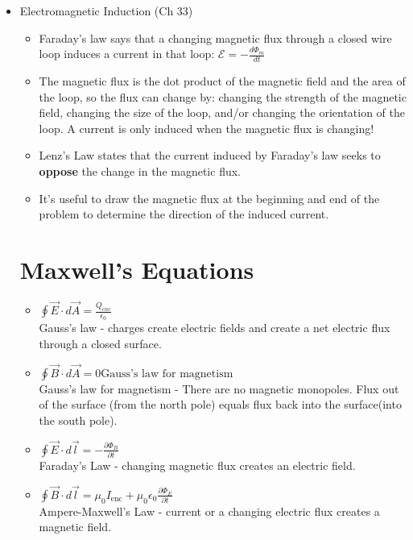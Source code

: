 \begin{itemize}
\item Electromagnetic Induction (Ch 33)
\begin{itemize}
\item Faraday's law says that a changing magnetic flux through a
  closed wire loop induces a current in that loop: $\displaystyle
  \mathcal{E} = - \frac{d \Phi_{m}}{dt}$
\item The magnetic flux is the dot product of the magnetic field and
  the area of the loop, so the flux can change by: changing the
  strength of the magnetic field, changing the size of the loop, and/or
  changing the orientation of the loop.  A current is only induced
  when the magnetic flux is changing! 
\item Lenz's Law states that the current induced by Faraday's law
  seeks to {\bf oppose} the change in the magnetic flux.   
\item It's useful to draw the magnetic flux at the beginning and end
  of the problem to determine the direction of the induced current.
\end{itemize}

\section{Maxwell's Equations }%
\begin{itemize}
\item $\oint \vec{E}\cdot d\vec{A} = \frac{Q_{enc}}{\epsilon_0} $\\
Gauss's law - charges create electric fields and create a net electric flux through a closed surface.
 \item $\oint \vec{B}\cdot d\vec{A} = 0 \text{Gauss's law for magnetism}$\\
 Gauss's law for magnetism - There are no magnetic monopoles.  Flux out of the surface (from the north pole) equals flux back into the surface(into the south pole).
\item $\displaystyle \oint \vec{E}\cdot d\vec{l} = -\frac{\partial \Phi_B}{\partial t}$\\
Faraday's Law - changing magnetic flux creates an electric field.

\item $\displaystyle \oint \vec{B}\cdot d\vec{l} = \mu_0 I_{\text{enc}} + \mu_0 \epsilon_0 \frac{\partial \Phi_E}{\partial t}$\\
Ampere-Maxwell's Law - current or a changing electric flux creates a magnetic field.
\end{itemize}


\end{itemize}
